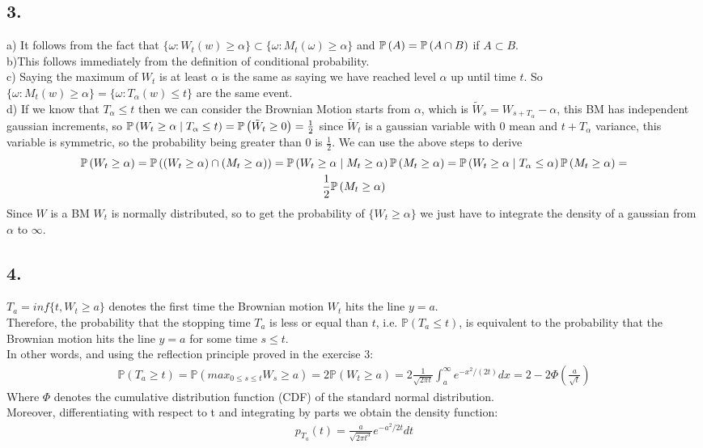 \subsection*{3.}
a) It follows from the fact that $\{\omega: W_t(w) \geq \alpha\} \subset \{\omega: M_t(\omega) \geq \alpha\}$ and $\mathbb{P}\left( A \right) = \mathbb{P}\left( A\cap B \right)$ if $A \subset B$. \\
b)This follows immediately from the definition of conditional probability. \\
c) Saying the maximum of $W_t$ is at least $\alpha$ is the same as saying we have reached level $\alpha$ up until time $t$. So $\{\omega: M_t(w) \geq \alpha\}=\{\omega: T_{\alpha}(w)\leq t\}$ are the same event. \\
d) If we know that $T_{\alpha}\leq t$ then we can consider the Brownian Motion starts from $\alpha$, which is $\tilde{W}_s=W_{s+T_{\alpha}}-\alpha$, this BM has independent gaussian increments, so $\mathbb{P}\left( W_t \geq \alpha \mid T_{\alpha}\leq t \right)=\mathbb{P}\left( \tilde{W}_t\geq 0 \right)=\frac{1}{2}$ since $\tilde{W}_t$ is a gaussian variable with $0$ mean and $t+T_{\alpha}$ variance, this variable is symmetric, so the probability being greater than $0$ is $\frac{1}{2}$.
We can use the above steps to derive
\begin{gather*}
    \mathbb{P}\left( W_t\geq \alpha \right) = \mathbb{P}\left( (W_t \geq \alpha) \cap (M_t \geq \alpha) \right) = \mathbb{P}\left( W_t \geq \alpha \mid M_t \geq \alpha \right)\mathbb{P}\left( M_t\geq \alpha \right) = \mathbb{P}\left( W_t \geq \alpha \mid T_{\alpha} \leq \alpha \right)\mathbb{P}\left( M_t\geq \alpha \right) = \\
    \frac{1}{2}\mathbb{P}\left( M_t\geq \alpha \right)
\end{gather*}
Since $W$ is a BM $W_t$ is normally distributed, so to get the probability of $\{W_t\geq \alpha\}$ we just have to integrate the density of a gaussian from $\alpha$ to $\infty$.

\subsection*{4.}
$T_a=inf\{t,W_t \geq a\}$ denotes the first time the Brownian motion $W_t$ hits the line $y=a$.\\
Therefore, the probability that the stopping time $T_a$ is less or equal than $t$, i.e.  $\mathbb{P}(T_a \leq t)$, is equivalent to the probability that the Brownian motion hits the line $y=a$ for some time $s \leq t$.\\
In other words, and using the reflection principle proved in the exercise 3:
\begin{gather*}
    \mathbb{P}(T_a \geq t) = \mathbb{P}(max_{0 \leq s \leq t} W_s \geq a) = 2\mathbb{P}(W_t \geq a) = 2\frac{1}{\sqrt{2\pi t}}\int_{a}^{\infty}e^{-x^2/(2t)} dx = 2-2\Phi(\frac{a}{\sqrt{t}})
\end{gather*}
Where $\Phi$ denotes the cumulative distribution function (CDF) of the standard normal distribution.\\
Moreover, differentiating with respect to t and integrating by parts we obtain the density function:
\begin{gather*}
    p_{T_a}(t)=\frac{a}{\sqrt{2\pi t^3}}e^{-a^2/2t}dt
\end{gather*}
